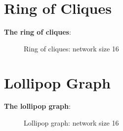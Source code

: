 \section{Ring of Cliques}
\textbf{The ring of cliques}: \cite{Mahlmann2010}
\begin{figure}
    \centering
    \scalebox{1}{}
    \caption{Ring of cliques: network size 16}
    \label{fig:ringofcliquesDemo}
\end{figure}

\section{Lollipop Graph}
\textbf{The lollipop graph}: \cite{JonassonLollipopGraphs2000}
\begin{figure}
    \centering
    \scalebox{1}{}
    \caption{Lollipop graph: network size 16}
    \label{fig:lollipopgraphDemo}
\end{figure}